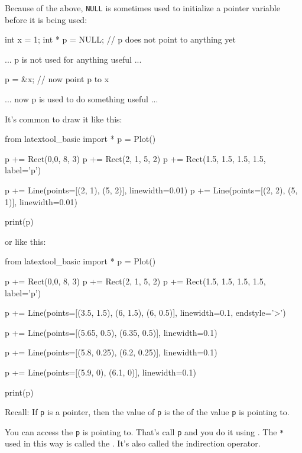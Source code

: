 Because of the above, \texttt{NULL} is sometimes used to initialize a pointer variable before it is being used:

\begin{consolethree}[escapeinside=||]
int x = 1;
int * p = NULL;   // p does not point to anything yet

... p is not used for anything useful ...

p = \&x;          // now point p to x

... now p is used to do something useful ...
\end{consolethree}

It's common to draw it like this:

\begin{python}
from latextool_basic import *
p = Plot()

p += Rect(0,0, 8, 3)
p += Rect(2, 1, 5, 2)
p += Rect(1.5, 1.5, 1.5, 1.5, label='p')

p += Line(points=[(2, 1), (5, 2)], linewidth=0.01)
p += Line(points=[(2, 2), (5, 1)], linewidth=0.01)

print(p)
\end{python}

or like this:

\begin{python}
from latextool_basic import *
p = Plot()

p += Rect(0,0, 8, 3)
p += Rect(2, 1, 5, 2)
p += Rect(1.5, 1.5, 1.5, 1.5, label='p')

p += Line(points=[(3.5, 1.5), (6, 1.5), (6, 0.5)], linewidth=0.1, endstyle='>')

p += Line(points=[(5.65, 0.5), (6.35, 0.5)], linewidth=0.1)

p += Line(points=[(5.8, 0.25), (6.2, 0.25)], linewidth=0.1)

p += Line(points=[(5.9, 0), (6.1, 0)], linewidth=0.1)

print(p)
\end{python}


\newpage{}

Recall: If \texttt{p} is a pointer, then the value of \texttt{p} is the  of the value \texttt{p} is pointing to.

You can access the  \texttt{p} is pointing to. That's call  \texttt{p} and you do it using . The \texttt{*} used in this way is called the . It's also called the indirection operator.

